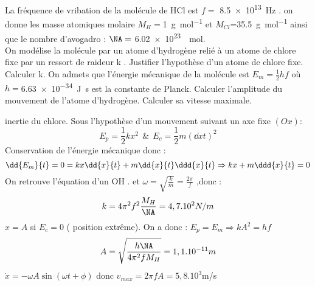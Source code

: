 \begin{Exercise}[title=Vibration d'une molécule]
La fréquence de vribation de la molécule de HCl est $f=$ \SI{8.5e13}{\Hz} . on donne les masse atomiques molaire $M_H=$\SI{1}{\g\per\mol} et $M_{Cl}$=\SI{35.5}{\g\per\mol} ainsi que le nombre d'avogadro : $\NA=$ \SI{6.02e23}{\per\mol}. \\
On modélise la molécule par un atome d'hydrogène relié à un atome  de chlore fixe par un ressort de raideur k .
	\Question Justifier l'hypothèse d'un atome de chlore fixe.
	\Question Calculer k.
	\Question On admets que l'énergie mécanique de la molécule est $E_m= \frac{1}{2}h f $ où $h=$\SI{6.63e-34}{\joule\second} est la constante de Planck. Calculer l'amplitude du mouvement de l'atome d'hydrogène.
	\Question Calculer sa vitesse maximale.
\end{Exercise}
\begin{Answer}
	\Question inertie du chlore.
	\Question Sous l'hypothèse d'un mouvement suivant un axe fixe $(Ox)$:
	\[E_p = \frac{1}{2}kx^2  ~~\& ~~ E_c = \frac{1}{2}m\left(\dd{x}{t}\right)^2 \]
	Conservation de l'énergie mécanique donc :
	\[ \dd{E_m}{t} = 0 = kx\dd{x}{t} + m\dd{x}{t} \ddd{x}{t} \Rightarrow  kx + m\ddd{x}{t} = 0 \]
	On retrouve l'équation d'un OH .  et  $\omega = \sqrt{\frac{k}{m}} = \frac{2\pi}{f}$ ,donc :
	\[ k= 4\pi^2 f^2 \frac{M_H}{\NA} = 4,7. 10^2N/m \]
	\Question $x=A$ si $E_c = 0 $ ( position extrême). On a donc :
	$ E_p=E_m \Rightarrow kA^2= hf$
	\[A=\sqrt{\frac{h\NA}{4\pi^2fM_H}}=1,1.10^{-11}m\]
	\Question $\dot{x}=-\omega A \sin(\omega t + \phi)$ donc $v_{max}= 2\pi f A = 5,8.10^3$m/s
  \end{Answer}
